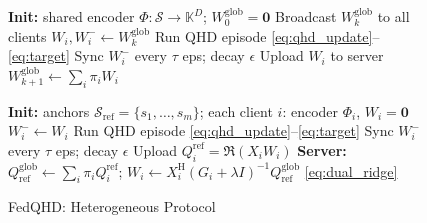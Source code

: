 \begin{figure}[t]
\begin{minipage}[t]{0.48\textwidth}
\begin{algorithm}[H]
\caption{FedQHD: Homogeneous Protocol}
\label{alg:fedqhd_shared}
\begin{algorithmic}[1]
\STATE \textbf{Init:} shared encoder
       $\Phi:\mathcal{S}\to\mathbb{K}^D$;\;
       $W^{\mathrm{glob}}_0 = \mathbf{0}$
    \STATE Broadcast $W^{\mathrm{glob}}_k$ to all clients
        \STATE $W_i, W_i^- \leftarrow W^{\mathrm{glob}}_k$
            \STATE Run QHD episode
                   \eqref{eq:qhd_update}--\eqref{eq:target}
            \STATE Sync $W_i^-$ every $\tau$ eps; decay $\epsilon$
        \ENDFOR
        \STATE Upload $W_i$ to server
    \ENDFOR
    \STATE $W^{\mathrm{glob}}_{k+1} \leftarrow
           \sum_{i} \pi_i W_i$
\ENDFOR
\end{algorithmic}
\end{algorithm}
\end{minipage}
\hfill
\begin{minipage}[t]{0.48\textwidth}
\begin{algorithm}[H]
\caption{FedQHD: Heterogeneous Protocol}
\label{alg:fedqhd_heterogeneous}
\begin{algorithmic}[1]
\STATE \textbf{Init:} anchors
       $\mathcal{S}_{\mathrm{ref}}\!=\!\{s_1,\ldots,s_m\}$;
       each client $i$: encoder $\Phi_i$, $W_i\!=\!\mathbf{0}$
        \STATE $W_i^- \leftarrow W_i$
            \STATE Run QHD episode
                   \eqref{eq:qhd_update}--\eqref{eq:target}
            \STATE Sync $W_i^-$ every $\tau$ eps; decay $\epsilon$
        \ENDFOR
        \STATE Upload $Q^{\mathrm{ref}}_i\!=\!\Re(X_iW_i)$
    \ENDFOR
    \STATE \textbf{Server:}
           $Q^{\mathrm{glob}}_{\mathrm{ref}} \leftarrow
           \sum_{i} \pi_i Q^{\mathrm{ref}}_i$;
        \STATE $W_i \leftarrow X_i^{\mathrm{H}}
               (G_i\!+\!\lambda I)^{-1}
               Q^{\mathrm{glob}}_{\mathrm{ref}}$ \eqref{eq:dual_ridge}
    \ENDFOR
\ENDFOR
\end{algorithmic}
\end{algorithm}
\end{minipage}
\end{figure}



